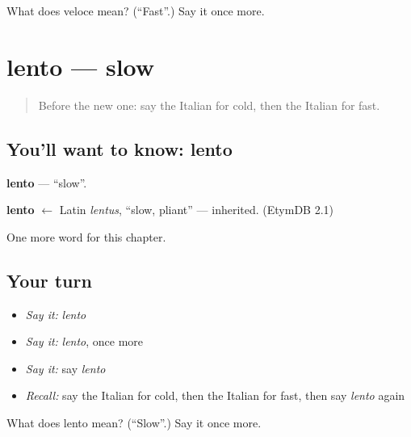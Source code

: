 \begin{tcolorbox}[breakable,colback=teal!4,colframe=teal!35!black,title={Before you move on}]
What does veloce mean? (\textquotedblleft{}Fast\textquotedblright{}.) Say it once more.
\end{tcolorbox}
\section[lento]{lento — slow}

\label{lesson:IT-C74-lento}



\begin{quote}
Before the new one: say the Italian for cold, then the Italian for fast.
\end{quote}

\subsection*{You'll want to know: lento}
\textbf{lento} — \textquotedblleft{}slow\textquotedblright{}.

\begin{cousinweb}
\textbf{lento} $\leftarrow$ Latin \emph{lentus}, \textquotedblleft{}slow, pliant\textquotedblright{} — inherited. (EtymDB 2.1)
\end{cousinweb}

\begin{grammarlens}[title={What you've built}]
One more word for this chapter.
\end{grammarlens}

\subsection*{Your turn}
\begin{itemize}
\raggedright
  \item \emph{Say it:} \emph{lento}
  \item \emph{Say it:} \emph{lento}, once more
  \item \emph{Say it:} say \emph{lento}
  \item \emph{Recall:} say the Italian for cold, then the Italian for fast, then say \emph{lento} again
\end{itemize}

\begin{tcolorbox}[breakable,colback=teal!4,colframe=teal!35!black,title={Before you move on}]
What does lento mean? (\textquotedblleft{}Slow\textquotedblright{}.) Say it once more.
\end{tcolorbox}
